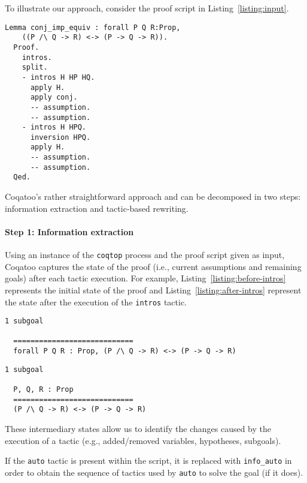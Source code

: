 \documentclass[sigplan,9pt]{acmart}\settopmatter{printfolios=true,printccs=false,printacmref=false}
\begin{document}
To illustrate our approach, consider the proof script in Listing~\ref{listing:input}.
\begin{lstlisting}[label=listing:input,captionpos=b,caption=Input]
  Lemma conj_imp_equiv : forall P Q R:Prop, 
    ((P /\ Q -> R) <-> (P -> Q -> R)).
  Proof.
    intros.
    split.
    - intros H HP HQ.
      apply H.
      apply conj.
      -- assumption.
      -- assumption.
    - intros H HPQ.
      inversion HPQ.
      apply H.
      -- assumption.
      -- assumption.
  Qed.
\end{lstlisting}

Coqatoo's rather straightforward approach and can be decomposed in two steps: information extraction and tactic-based rewriting. 

\paragraph{Step 1: Information extraction}
Using an instance of the \texttt{coqtop} process and the proof script given as input, Coqatoo captures the state of the proof (i.e., current assumptions and remaining goals) after each tactic execution. For example, Listing~\ref{listing:before-intros} represents the initial state of the proof and Listing~\ref{listing:after-intros} represent the state after the execution of the \lstinline{intros} tactic.
\begin{lstlisting}[label=listing:before-intros, captionpos=b,caption={State before executing the first intros tactic}]
  1 subgoal
  
  ============================
  forall P Q R : Prop, (P /\ Q -> R) <-> (P -> Q -> R)
\end{lstlisting}

\begin{lstlisting}[label=listing:after-intros,captionpos=b,caption={State after executing the first intros tactic}]
  1 subgoal
  
  P, Q, R : Prop
  ============================
  (P /\ Q -> R) <-> (P -> Q -> R)
\end{lstlisting}
These intermediary states allow us to identify the changes caused by the execution of a tactic (e.g., added/removed variables, hypotheses, subgoals).

If the \lstinline{auto} tactic is present within the script, it is replaced with \lstinline{info_auto} in order to obtain the sequence of tactics used by \lstinline{auto} to solve the goal (if it does).
\end{document}
